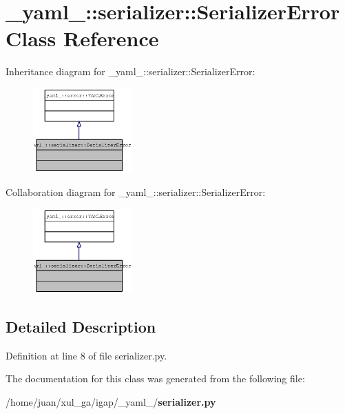 \section{\_\-yaml\_\-::serializer::SerializerError Class Reference}
\label{class__yaml___1_1serializer_1_1SerializerError}
Inheritance diagram for \_\-yaml\_\-::serializer::SerializerError:\nopagebreak
\begin{figure}[H]
\begin{center}
\leavevmode
\includegraphics[width=108pt]{class__yaml___1_1serializer_1_1SerializerError__inherit__graph}
\end{center}
\end{figure}
Collaboration diagram for \_\-yaml\_\-::serializer::SerializerError:\nopagebreak
\begin{figure}[H]
\begin{center}
\leavevmode
\includegraphics[width=108pt]{class__yaml___1_1serializer_1_1SerializerError__coll__graph}
\end{center}
\end{figure}


\subsection{Detailed Description}


Definition at line 8 of file serializer.py.

The documentation for this class was generated from the following file:\begin{CompactItemize}
\item 
/home/juan/xul\_\-ga/igap/\_\-yaml\_\-/{\bf serializer.py}\end{CompactItemize}
